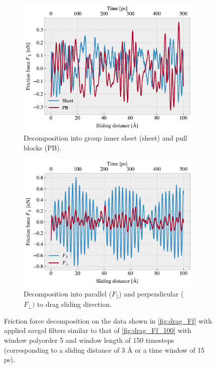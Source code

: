 \begin{figure}[H]
  \centering
  \begin{subfigure}[t]{0.49\textwidth}
    \centering
    \includegraphics[width=\textwidth]{figures/baseline/decomp_group.pdf}
    \caption{Decomposition into group inner sheet (sheet) and pull blocks (PB).}
    \label{fig:decomp_group}
  \end{subfigure}
  \hfill
  \begin{subfigure}[t]{0.49\textwidth}
      \centering
      \includegraphics[width=\textwidth]{figures/baseline/decomp_direc.pdf}
      \caption{Decomposition into parallel ($F_{\parallel}$) and perpendicular ($F_{\perp})$ to drag sliding direction.}
      \label{fig:decomp_direc}
  \end{subfigure}
  \caption{Friction force decomposition on the data shown in \cref{fig:drag_Ff} with applied savgol filters similar to that of \cref{fig:drag_Ff_100} with window polyorder 5 and window length of 150 timesteps (corresponding to a sliding distance of 3 Å or a time window of 15 ps).}
  \label{fig:decomp}
\end{figure}


